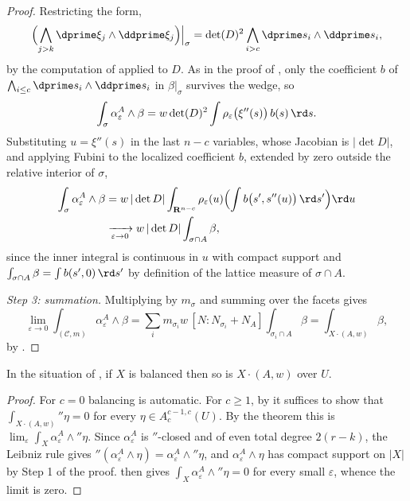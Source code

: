 \begin{proof}
Restricting the form,
\[
 \Bigl(\bigwedge_{j>k}\dprime\xi_j\wedge\ddprime\xi_j\Bigr)\Big|_\sigma
 =\det(D)^2\bigwedge_{i>c}\dprime s_i\wedge\ddprime s_i ,
\]
by the computation of  applied to $D$.
As in the proof of , only the
coefficient $b$ of $\bigwedge_{i\le c}\dprime s_i\wedge\ddprime s_i$ in
$\beta|_\sigma$ survives the wedge, so
\[
 \int_\sigma\alpha^A_\varepsilon\wedge\beta
 =w\det(D)^2\int\rho_\varepsilon\bigl(\xi''(s)\bigr)\,b(s)\,\rd s .
\]
Substituting $u=\xi''(s)$ in the last $n-c$ variables, whose Jacobian is
$|\det D|$, and applying Fubini to the localized coefficient $b$, extended
by zero outside the relative interior of $\sigma$,
\[
 \begin{aligned}
  \int_\sigma\alpha^A_\varepsilon\wedge\beta
   &=w\,|\det D|\int_{\mathbf R^{n-c}}\rho_\varepsilon(u)
     \Bigl(\int b\bigl(s',s''(u)\bigr)\,\rd s'\Bigr)\rd u\\
   &\xrightarrow[\varepsilon\to0]{}
     w\,|\det D|\int_{\sigma\cap A}\beta ,
 \end{aligned}
\]
since the inner integral is continuous in $u$ with compact support and
$\int_{\sigma\cap A}\beta=\int b(s',0)\,\rd s'$ by definition of the lattice
measure of $\sigma\cap A$.

\emph{Step 3: summation.}  Multiplying by $m_\sigma$ and summing over the
facets gives
\[
 \lim_{\varepsilon\to0}\int_{(\mathscr C,m)}\alpha^A_\varepsilon\wedge\beta
 =\sum_im_{\sigma_i}w\,[N:N_{\sigma_i}+N_A]\int_{\sigma_i\cap A}\beta
 =\int_{X\cdot(A,w)}\beta ,
\]
by .
\end{proof}

\begin{corollary}
\label{cor:ch11-transverse-balanced}
In the situation of , if $X$ is
balanced then so is $X\cdot(A,w)$ over $U$.
\end{corollary}

\begin{proof}
For $c=0$ balancing is automatic.  For $c\ge1$, by
 it suffices to show that
$\int_{X\cdot(A,w)}\dprime\eta=0$ for every
$\eta\in A^{c-1,c}_c(U)$.  By the theorem this is
$\lim_\varepsilon\int_X\alpha^A_\varepsilon\wedge\dprime\eta$.  Since
$\alpha^A_\varepsilon$ is $\dprime$-closed and of even total degree
$2(r-k)$, the Leibniz rule gives
$\dprime(\alpha^A_\varepsilon\wedge\eta)
=\alpha^A_\varepsilon\wedge\dprime\eta$, and
$\alpha^A_\varepsilon\wedge\eta$ has compact support on $|X|$ by Step 1 of
the proof.   then gives
$\int_X\alpha^A_\varepsilon\wedge\dprime\eta=0$ for every small
$\varepsilon$, whence the limit is zero.
\end{proof}

